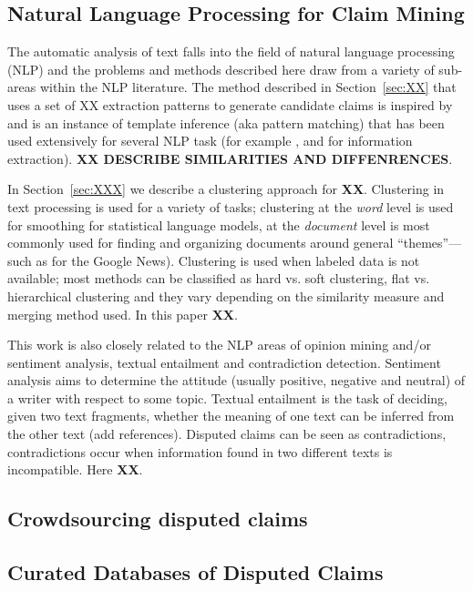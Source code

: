 

\subsection{Natural Language Processing for Claim Mining}

The automatic analysis of text falls into the field of natural language processing (NLP) 
and the problems and methods described here draw from a variety of sub-areas within the NLP literature. 
The method described in Section~\ref{sec:XX} that uses a set of XX extraction patterns to generate 
candidate claims  is inspired by \cite{hearst92} and is an instance of template inference (aka pattern matching) 
that has been used extensively for several NLP task (for example \cite{Riloff93}, \cite{Jones99} and 
\cite{etzioni05} for information extraction). {\bf XX DESCRIBE SIMILARITIES AND DIFFENRENCES}. 

In Section~\ref{sec:XXX} we describe a clustering approach for {\bf XX}. 
Clustering in text processing is used for a variety  of tasks; clustering at the {\em word} level 
is used for smoothing for statistical language models, at the {\em document} level is most commonly 
used for finding and organizing documents around  general “themes”—such as for the Google News). 
Clustering is used when labeled data is not available; most methods can be classified as hard vs. 
soft clustering, flat vs. hierarchical clustering and they vary depending on the similarity measure 
and merging method used. In this paper {\bf XX}. 

This work is also closely related to the NLP areas of opinion mining and/or sentiment analysis, 
textual entailment and contradiction detection. Sentiment analysis aims to determine the attitude 
(usually positive, negative and neutral) of a writer with respect to some topic\cite{pangLee}. 
Textual entailment is the task of deciding, given two text fragments, whether the meaning of one 
text can be inferred from the other text (add references). Disputed claims can be seen as 
contradictions, contradictions occur when information found in two different texts is 
incompatible\cite{harabagiu}. Here {\bf XX}.



\subsection{Crowdsourcing disputed claims}


\subsection{Curated Databases of Disputed Claims}


